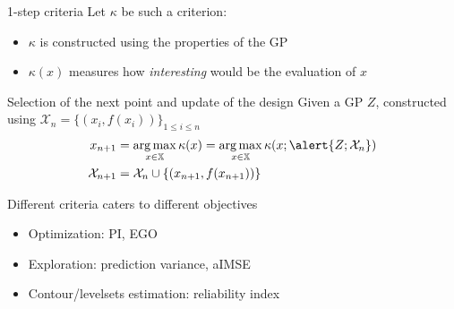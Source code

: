\documentclass[10pt,aspectratio=169,usepdftitle=false]{beamer}
\newcommand{\Xspace}{\mathbb{X}}
\DeclareMathOperator*{\argmax}{arg\,max}
\begin{document}
\begin{frame}{1-step criteria}
  Let $\kappa$ be such a criterion:
  \begin{itemize}
  \item $\kappa$ is constructed using the properties of the GP
  \item $\kappa(x)$ measures how \emph{interesting} would be the
    evaluation of $x$
  \end{itemize}
  \begin{block}{Selection of the next point and update of the design}
      Given a GP $Z$, constructed using
      $\mathcal{X}_n = \{(x_i, f(x_i))\}_{1\leq i \leq n}$
      \begin{align}
    x_{n+1} &= \argmax_{x \in \Xspace} \kappa(x) = \argmax_{x \in \Xspace} \kappa(x; \alert{Z; \mathcal{X}_n}) \\
    \mathcal{X}_{n+1} &= \mathcal{X}_n \cup \{(x_{n+1},f(x_{n+1})) \}
  \end{align}
\end{block}
\pause
  Different criteria caters to different objectives
  \begin{itemize}
  \item Optimization: PI, EGO \citep{jones_efficient_1998,hernandez-lobato_predictive_2014}
  \item Exploration: prediction variance, aIMSE
  \item Contour/levelsets estimation: reliability index \citep{bect_sequential_2012,picheny_adaptive_2010}
  \end{itemize}
\end{frame}
\end{document}
